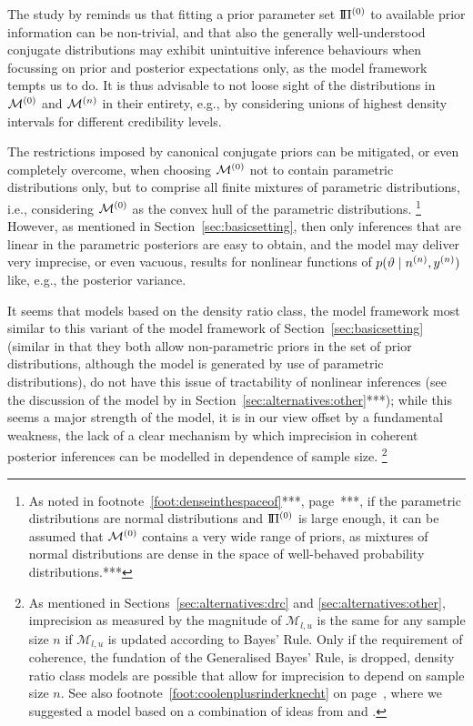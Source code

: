 The study by \textcite[see the discussion in Section~\ref{sec:alternatives:other}***]{2011:krautenbacher}
reminds us that fitting a prior parameter set $\text{I}\!\Pi^{(0)}$
to available prior information can be non-trivial,
and that also the generally well-understood conjugate distributions may exhibit
unintuitive inference behaviours when focussing on prior and posterior expectations only,
as the model framework tempts us to do.
It is thus advisable to not loose sight of the distributions in $\mathcal{M}^{(0)}$ and $\mathcal{M}^{(n)}$ in their entirety, %
e.g., by considering unions of highest density intervals for different credibility levels.

The restrictions imposed by canonical conjugate priors can be mitigated,
or even completely overcome,
when choosing $\mathcal{M}^{(0)}$ not to contain parametric distributions only,
but to comprise all finite mixtures of parametric distributions,
i.e., considering $\mathcal{M}^{(0)}$ as the convex hull of the parametric distributions.%
\footnote{As noted in footnote~\ref{foot:denseinthespaceof}***, page~\pageref{foot:denseinthespaceof}***,
if the parametric distributions are normal distributions and $\text{I}\!\Pi^{(0)}$ is large enough,
it can be assumed that $\mathcal{M}^{(0)}$ contains a very wide range of priors,
as mixtures of normal distributions are dense in the space of well-behaved probability distributions.***}
However, as mentioned in Section~\ref{sec:basicsetting},
then only inferences that are linear in the parametric posteriors are easy to obtain,
and the model may deliver very imprecise, or even vacuous, results
for nonlinear functions of $p(\vartheta\mid n^{(n)},y^{(n)})$ like, e.g., the posterior variance.

It seems that models based on the density ratio class,
the model framework most similar to this variant of the model framework of Section~\ref{sec:basicsetting}
(similar in that they both allow non-parametric priors in the set of prior distributions,
although the model is generated by use of parametric distributions),
do not have this issue of tractability of nonlinear inferences
(see the discussion of the model by \textcite[\S 4]{2011:rinderknecht} in Section~\ref{sec:alternatives:other}***);
while this seems a major strength of the model,
it is in our view offset by a fundamental weakness,
the lack of a clear mechanism by which imprecision in coherent posterior inferences
can be modelled in dependence of sample size.%
\footnote{As mentioned in Sections~\ref{sec:alternatives:drc} and \ref{sec:alternatives:other},
imprecision as measured by the magnitude of $\mathcal{M}_{l,u}$ is the same for any sample size $n$
if $\mathcal{M}_{l,u}$ is updated according to Bayes' Rule.
Only if the requirement of coherence, the fundation of the Generalised Bayes' Rule, is dropped,
density ratio class models are possible that allow for imprecision to depend on sample size $n$.
See also footnote~\ref{foot:coolenplusrinderknecht} on page~\pageref{foot:coolenplusrinderknecht},
where we suggested a model based on a combination of ideas from \textcite{1993:coolen} and \textcite{2011:rinderknecht:diss}.}


